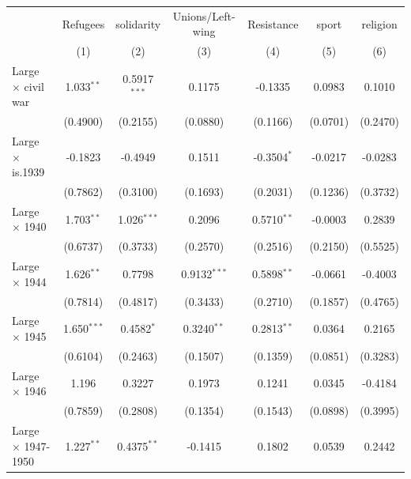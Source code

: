 
\begingroup
\centering
\begin{tabular}{lcccccc}
   \toprule
                                     & Refugees      & solidarity     & Unions/Left-wing & Resistance    & sport         & religion\\  
                                     & (1)           & (2)            & (3)              & (4)           & (5)           & (6)\\  
   \midrule 
   Large $\times$ civil war          & 1.033$^{**}$  & 0.5917$^{***}$ & 0.1175           & -0.1335       & 0.0983        & 0.1010\\   
                                     & (0.4900)      & (0.2155)       & (0.0880)         & (0.1166)      & (0.0701)      & (0.2470)\\   
   Large $\times$ is.1939            & -0.1823       & -0.4949        & 0.1511           & -0.3504$^{*}$ & -0.0217       & -0.0283\\   
                                     & (0.7862)      & (0.3100)       & (0.1693)         & (0.2031)      & (0.1236)      & (0.3732)\\   
   Large $\times$ 1940               & 1.703$^{**}$  & 1.026$^{***}$  & 0.2096           & 0.5710$^{**}$ & -0.0003       & 0.2839\\   
                                     & (0.6737)      & (0.3733)       & (0.2570)         & (0.2516)      & (0.2150)      & (0.5525)\\   
   Large $\times$ 1944               & 1.626$^{**}$  & 0.7798         & 0.9132$^{***}$   & 0.5898$^{**}$ & -0.0661       & -0.4003\\   
                                     & (0.7814)      & (0.4817)       & (0.3433)         & (0.2710)      & (0.1857)      & (0.4765)\\   
   Large $\times$ 1945               & 1.650$^{***}$ & 0.4582$^{*}$   & 0.3240$^{**}$    & 0.2813$^{**}$ & 0.0364        & 0.2165\\   
                                     & (0.6104)      & (0.2463)       & (0.1507)         & (0.1359)      & (0.0851)      & (0.3283)\\   
   Large $\times$ 1946               & 1.196         & 0.3227         & 0.1973           & 0.1241        & 0.0345        & -0.4184\\   
                                     & (0.7859)      & (0.2808)       & (0.1354)         & (0.1543)      & (0.0898)      & (0.3995)\\   
   Large $\times$ 1947-1950          & 1.227$^{**}$  & 0.4375$^{**}$  & -0.1415          & 0.1802        & 0.0539        & 0.2442\\   

\end{tabular}

